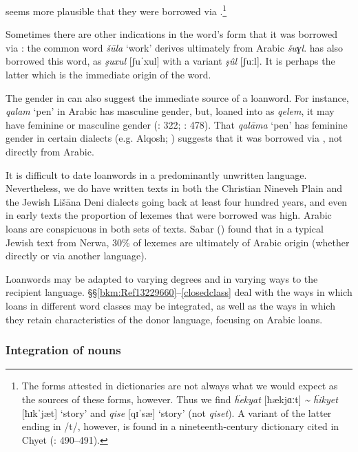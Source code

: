 \documentclass[output=paper]{langsci/langscibook}
\begin{document}
seems more plausible that they were borrowed via .\footnote{The  forms attested in dictionaries are not always what we would expect as the sources of these forms, however. Thus we find \textit{ḧekyat} [ħækjɑːt] \textit{{\textasciitilde} ḧikyet} [ħɪk\textrm{ˈ}jæt] ‘story’  and \textit{qise} [qɪ\textrm{ˈ}sæ] ‘story’ (not \textit{qiset}). A variant of the latter ending in /t/, however, is found in a nineteenth-century dictionary cited in Chyet (\citeyear{Chyet2003}: 490–491).}

Sometimes there are other indications in the word’s form that it was borrowed via : the common  word \textit{šūla} ‘work’ derives ultimately from Arabic \textit{šuɣl}.  has also borrowed this word, as \textit{şuxul} [ʃuˈxul] with a variant \textit{şûl} [ʃuːl]. It is perhaps the latter which is the immediate origin of the  word.

The {gender} in  can also suggest the immediate source of a {loanword}. For instance, \textit{qalam} ‘pen’ in Arabic has masculine {gender}, but, loaned into  as \textit{qelem}, it may have feminine or masculine {gender} (\citealt{Rizgar1993}: 322; \citealt{Chyet2003}: 478). That \textit{qalāma} ‘pen’ has feminine {gender} in certain  dialects (e.g. Alqosh; \citealt[199]{Coghill2004}) suggests that it was borrowed via , not directly from Arabic.

It is difficult to date {loanwords} in a predominantly unwritten language. Nevertheless, we do have written texts in both the Christian Nineveh Plain and the Jewish Lišāna Deni dialects going back at least four hundred years, and even in early texts the proportion of lexemes that were borrowed was high. Arabic loans are conspicuous in both sets of texts. Sabar (\citeyear[208]{Sabar1984}) found that in a typical Jewish text from Nerwa, 30\% of lexemes are ultimately of Arabic origin (whether directly or via another language).

Loanwords may be adapted to varying degrees and in varying ways to the {recipient language}. §§\ref{bkm:Ref13229660}–\ref{closedclass} deal with the ways in which loans in different word classes may be integrated, as well as the ways in which they retain characteristics of the donor language, {focusing} on Arabic loans.

\subsubsection{\label{bkm:Ref13229660}Integration of nouns}
\end{document}

